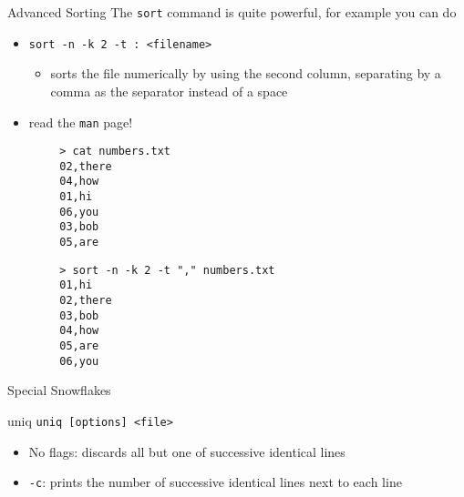 \documentclass[11pt]{beamer}
\newcommand{\colbf}[1]{\textcolor{mLightBrown!77!black}{#1}}%
\begin{document}
\begin{frame}[fragile]{Advanced Sorting}
  The \texttt{sort} command is quite powerful, for example you can do
  \begin{itemize}
    \item \texttt{sort -n -k 2 -t : <filename>}
    \begin{itemize}
      \item sorts the file numerically by using the second column, separating by a comma as the separator instead
            of a space
    \end{itemize}
    \item read the \texttt{man} page!
  \end{itemize}
  \vspace*{-2ex}
  \begin{minipage}[t]{\textwidth}
    \begin{minipage}[t]{.48\textwidth}
      \begin{verbatim}
        > cat numbers.txt
        02,there
        04,how
        01,hi
        06,you
        03,bob
        05,are
      \end{verbatim}
    \end{minipage}
    \hfill
    \begin{minipage}[t]{.48\textwidth}
      \begin{verbatim}
        > sort -n -k 2 -t "," numbers.txt
        01,hi
        02,there
        03,bob
        04,how
        05,are
        06,you
      \end{verbatim}
    \end{minipage}
  \end{minipage}
\end{frame}

\begin{frame}[fragile]{Special Snowflakes}
  \begin{block}{\colbf{uniq}}
    \texttt{uniq [options] <file>}
    \begin{itemize}
      \item No flags: discards all but one of successive identical lines
      \item \texttt{-c}: prints the number of successive identical lines next to each line
    \end{itemize}
  \end{block}
\end{frame}
\end{document}
